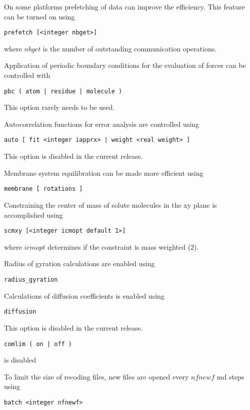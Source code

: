 \begin{description}
\item
On some platforms prefetching of data can improve the efficiency. This 
feature can be turned on using

\begin{verbatim}
prefetch [<integer nbget>]
\end{verbatim}
where $nbget$ is the number of outstanding communication operations.

\item
Application of periodic boundary conditions for the evaluation of
forces can be controlled with

\begin{verbatim}
pbc ( atom | residue | molecule )
\end{verbatim}

This option rarely needs to be used.

\item
Autocorrelation functions for error analysis are controlled using

\begin{verbatim}
auto [ fit <integer iapprx> | weight <real weight> ]
\end{verbatim}

This option is disabled in the current release.

\item
Membrane system equilibration can be made more efficient using
 
\begin{verbatim}
membrane [ rotations ]
\end{verbatim}

\item
Constraining the center of mass of solute molecules in the xy plane is
accomplished using

\begin{verbatim}
scmxy [<integer icmopt default 1>]
\end{verbatim}

where $icmopt$ determines if the constraint is mass weighted (2). 

\item
Radius of gyration calculations are enabled using

\begin{verbatim}
radius_gyration
\end{verbatim}

\item
Calculations of diffusion coefficients is enabled using

\begin{verbatim}
diffusion
\end{verbatim}
This option is disabled in the current release.

\item

\begin{verbatim}
comlim ( on | off )
\end{verbatim}
is disabled

\item

To limit the size of recoding files, new files are opened every $nfnewf$ md steps using 

\begin{verbatim}
batch <integer nfnewf>
\end{verbatim}


\end{description}
